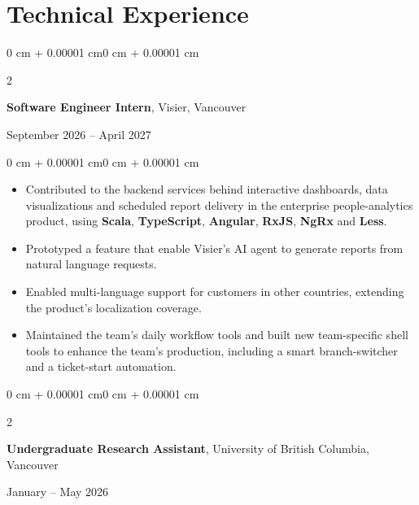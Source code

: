 \documentclass[10pt, letterpaper]{article}
\newenvironment{highlights}{
    \begin{itemize}[
        topsep=0.10 cm,
        parsep=0.10 cm,
        partopsep=0pt,
        itemsep=0pt,
        leftmargin=0 cm + 10pt
    ]
}{
    \end{itemize}
}
\newenvironment{onecolentry}{
    \begin{adjustwidth}{0 cm + 0.00001 cm}{0 cm + 0.00001 cm}
}{
    \end{adjustwidth}
}
\newenvironment{twocolentry}[2][]{
    \onecolentry
    \def\secondColumn{#2}
    \setcolumnwidth{\fill, 4.5 cm}
    \begin{paracol}{2}
}{
    \switchcolumn \raggedleft \secondColumn
    \end{paracol}
    \endonecolentry
}
\begin{document}
    \vspace{0.05 cm}

    \section{Technical Experience}

    \vspace{0.20 cm}
    
    \begin{twocolentry}{September 2026 -- April 2027}
        \textbf{Software Engineer Intern}, Visier, Vancouver
    \end{twocolentry}
    
    \vspace{0.10 cm}
    \begin{onecolentry}
        \begin{highlights}
            \item Contributed to the backend services behind interactive dashboards, data visualizations 
            and scheduled report delivery in the enterprise people-analytics product,
            using \textbf{Scala}, \textbf{TypeScript}, \textbf{Angular}, \textbf{RxJS}, \textbf{NgRx} and \textbf{Less}.
            \item Prototyped a feature that enable Visier's AI agent to generate reports from natural language requests.
            \item Enabled multi-language support for customers in other countries, extending the product's localization coverage.
            \item Maintained the team's daily workflow tools and built new team-specific shell tools to enhance the team's production, 
            including a smart branch-switcher and a ticket-start automation.
        \end{highlights}
    \end{onecolentry}

    \vspace{0.20 cm}

    \begin{twocolentry}{January -- May 2026}
        \textbf{Undergraduate Research Assistant}, University of British Columbia, Vancouver
    \end{twocolentry}
    
\end{document}
